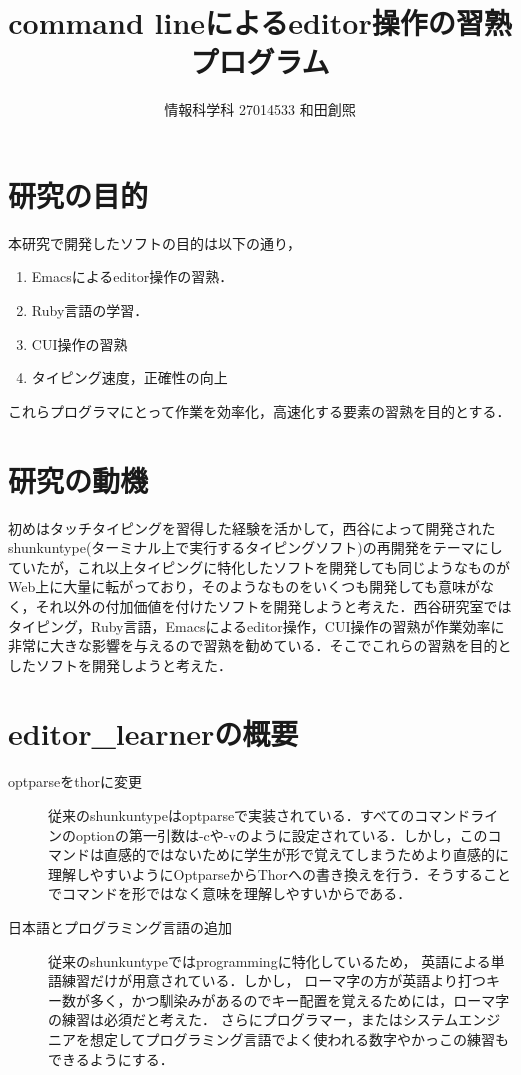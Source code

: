 \documentclass[a4j,twocolumn]{jsarticle}
\def\tightlist{\itemsep1pt\parskip0pt\parsep0pt}
\begin{document}
\title{command lineによるeditor操作の習熟プログラム}
\author{情報科学科 \hspace{5mm} 27014533 \hspace{5mm} 和田創煕}
\date{}
\maketitle

\section{研究の目的}
本研究で開発したソフトの目的は以下の通り，
\begin{enumerate}
\def\labelenumi{\arabic{enumi}.}
\tightlist
\item
Emacsによるeditor操作の習熟．
\item
Ruby言語の学習．
\item
CUI操作の習熟
\item
タイピング速度，正確性の向上
\end{enumerate}
これらプログラマにとって作業を効率化，高速化する要素の習熟を目的とする．


\section{研究の動機}
初めはタッチタイピングを習得した経験を活かして，西谷によって開発されたshunkuntype(ターミナル上で実行するタイピングソフト)の再開発をテーマにしていたが，これ以上タイピングに特化したソフトを開発しても同じようなものがWeb上に大量に転がっており，そのようなものをいくつも開発しても意味がなく，それ以外の付加価値を付けたソフトを開発しようと考えた．西谷研究室ではタイピング，Ruby言語，Emacsによるeditor操作，CUI操作の習熟が作業効率に非常に大きな影響を与えるので習熟を勧めている．そこでこれらの習熟を目的としたソフトを開発しようと考えた．

\section{editor\_learnerの概要}
\begin{description}
\item[optparseをthorに変更] 
従来のshunkuntypeはoptparseで実装されている．すべてのコマンドラインのoptionの第一引数は-cや-vのように設定されている．しかし，このコマンドは直感的ではないために学生が形で覚えてしまうためより直感的に理解しやすいようにOptparseからThorへの書き換えを行う．そうすることでコマンドを形ではなく意味を理解しやすいからである．

\item[日本語とプログラミング言語の追加]
従来のshunkuntypeではprogrammingに特化しているため，
英語による単語練習だけが用意されている．しかし，
ローマ字の方が英語より打つキー数が多く，かつ馴染みがあるのでキー配置を覚えるためには，ローマ字の練習は必須だと考えた．
さらにプログラマー，またはシステムエンジニアを想定してプログラミング言語でよく使われる数字やかっこの練習もできるようにする．

\end{description}
\end{document}
